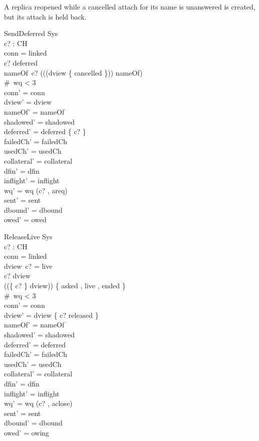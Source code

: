 \documentclass[a4paper,10pt,fleqn]{article}
\begin{document}
A replica reopened while a cancelled attach for its name is unanswered is created, but its attach is held back.

\begin{schema}{SendDeferred}
  \Delta Sys \\
  c? : CH \\
\where
  conn = linked \\
  c? \in deferred \\
  nameOf~c? \notin \ran ((\dom (dview \rres \{ cancelled \})) \dres nameOf) \\
  \#~wq < 3 \\
  conn' = conn \\
  dview' = dview \\
  nameOf' = nameOf \\
  shadowed' = shadowed \\
  deferred' = deferred \setminus \{ c? \} \\
  failedCh' = failedCh \\
  usedCh' = usedCh \\
  collateral' = collateral \\
  dfin' = dfin \\
  inflight' = inflight \\
  wq' = wq \cat \langle (c? , areq) \rangle \\
  sent' = sent \\
  dbound' = dbound \\
  owed' = owed
\end{schema}

\begin{schema}{ReleaseLive}
  \Delta Sys \\
  c? : CH \\
\where
  conn = linked \\
  dview~c? = live \\
  c? \in \dom dview \\
  (\ran (\{ c? \} \ndres dview)) \cap \{ asked , live , ended \} \neq \emptyset \\
  \#~wq < 3 \\
  conn' = conn \\
  dview' = dview \oplus \{ c? \mapsto released \} \\
  nameOf' = nameOf \\
  shadowed' = shadowed \\
  deferred' = deferred \\
  failedCh' = failedCh \\
  usedCh' = usedCh \\
  collateral' = collateral \\
  dfin' = dfin \\
  inflight' = inflight \\
  wq' = wq \cat \langle (c? , aclose) \rangle \\
  sent' = sent \\
  dbound' = dbound \\
  owed' = owing
\end{schema}
\end{document}
